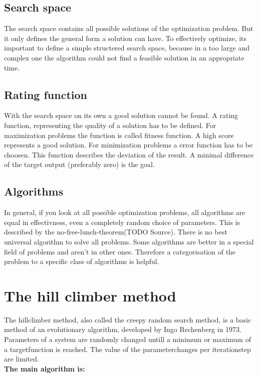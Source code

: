 \documentclass[10pt,a4paper,DIV=11]{scrreprt}
\begin{document}
\subsection{Search space}
The search space contains all possible solutions of the optimization problem. But it only defines the general form a solution can have. To effectively optimize, its important to define a simple structered search space, because in a too large and complex one the algorithm could not find a feasible solution in an appropriate time.

\subsection{Rating function}
With the search space on its own a good solution cannot be found. A rating function, representing the quality of a solution has to be defined. For maximization problems the function is called fitness function. A high score represents a good solution. For minimization problems a error function has to be choosen. This function describes the deviation of the result. A minimal difference of the target output (preferably zero) is the goal.

\subsection{Algorithms}
In general, if you look at all possible optimization problems, all algorithms are equal in effectivness, even a completely random choice of parameters. This is described by the no-free-lunch-theorem(TODO Source). There is no best universal algorithm to solve all problems. Some algorithms are better in a special field of problems and aren't in other ones. Therefore a categorisation of the problem to a specific class of algorithms is helpful.

\section{The hill climber method}
The hillclimber method, also called the creepy random search method, is a basic method of an evolutionary algorithm, developed by Ingo Rechenberg in 1973. %
Parameters of a system are randomly changed untill a minimum or maximum of a targetfunction is reached. The value of the parameterchanges per iterationstep are limited. \\

\textbf{The main algorithm is:}
\end{document}
